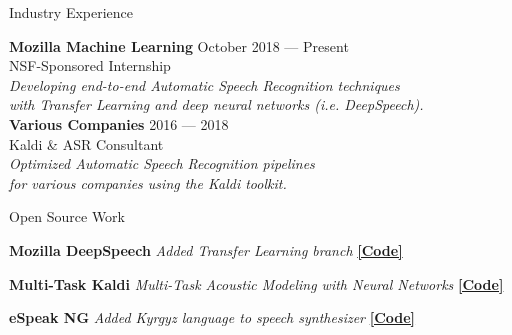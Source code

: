 \documentclass{resume} %
\begin{document}
\vfill

\begin{rSection}{Industry Experience}
  
{\bf Mozilla Machine Learning} \hfill {October 2018 --- Present} \\ 
NSF-Sponsored Internship \hfill {} \\
\textit{Developing end-to-end Automatic Speech Recognition techniques} \hfill {} \\
\textit{with Transfer Learning and deep neural networks (i.e. DeepSpeech).} \hfill {} \\
  
{\bf Various Companies} \hfill {2016 --- 2018} \\ 
Kaldi \& ASR Consultant  \hfill {} \\
\textit{Optimized Automatic Speech Recognition pipelines}   \hfill {} \\
\textit{for various companies using the Kaldi toolkit.}   \hfill {} \\
\end{rSection}

\vfill


\begin{rSection}{Open Source Work}

  {\textbf{Mozilla DeepSpeech}} {\hfill \textit{Added Transfer Learning branch} {\hspace{2.5cm} \href{https://github.com/mozilla/DeepSpeech/tree/transfer-learning}{\textbf{[Code]}}}} \\
\vspace{-.35cm}

{\textbf{Multi-Task Kaldi}} {\hfill \textit{Multi-Task Acoustic Modeling with Neural Networks} {\hspace{2.5cm} \href{https://github.com/JRMeyer/multi-task-kaldi}{\textbf{[Code]}}}} \\
\vspace{-.35cm}

{\textbf{eSpeak NG}} {\hfill \textit{Added Kyrgyz language to speech synthesizer} {\hspace{2.5cm} \href{https://github.com/rhdunn/espeak/commits?author=JRMeyer}{\textbf{[Code]}}}}\\
\vspace{-.35cm}

\end{rSection}
\end{document}
